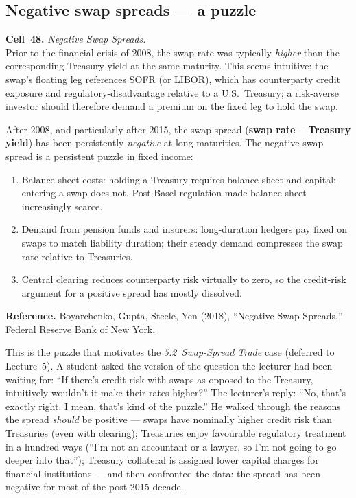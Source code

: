 \subsection{Negative swap spreads --- a puzzle}\label{L4-sec:sw-spread}

\begin{keyblock}
\textbf{Cell~48.} \emph{Negative Swap Spreads.}\\
Prior to the financial crisis of 2008, the swap rate was typically
\emph{higher} than the corresponding Treasury yield at the same maturity.
This seems intuitive: the swap's floating leg references SOFR (or LIBOR),
which has counterparty credit exposure and regulatory-disadvantage
relative to a U.S.~Treasury; a risk-averse investor should therefore
demand a premium on the fixed leg to hold the swap.

After 2008, and particularly after 2015, the swap spread
(\textbf{swap rate -- Treasury yield}) has been persistently
\emph{negative} at long maturities. The negative swap spread is a
persistent puzzle in fixed income:
\begin{enumerate}
  \item Balance-sheet costs: holding a Treasury requires balance sheet
        and capital; entering a swap does not. Post-Basel regulation made
        balance sheet increasingly scarce.
  \item Demand from pension funds and insurers: long-duration hedgers pay
        fixed on swaps to match liability duration; their steady demand
        compresses the swap rate relative to Treasuries.
  \item Central clearing reduces counterparty risk virtually to zero, so
        the credit-risk argument for a positive spread has mostly
        dissolved.
\end{enumerate}
\textbf{Reference.} Boyarchenko, Gupta, Steele, Yen (2018), ``Negative
Swap Spreads,'' Federal Reserve Bank of New York.
\end{keyblock}

This is the puzzle that motivates the \emph{5.2~Swap-Spread Trade} case
(deferred to Lecture~5). A student asked the version of the question the
lecturer had been waiting for: ``If there's credit risk with swaps as
opposed to the Treasury, intuitively wouldn't it make their rates
higher?'' The lecturer's reply: ``No, that's exactly right. I mean,
that's kind of the puzzle.'' He walked through the reasons the spread
\emph{should} be positive --- swaps have nominally higher credit risk
than Treasuries (even with clearing); Treasuries enjoy favourable
regulatory treatment in a hundred ways (``I'm not an accountant or a
lawyer, so I'm not going to go deeper into that''); Treasury collateral
is assigned lower capital charges for financial institutions --- and then
confronted the data: the spread has been negative for most of the
post-2015 decade.

